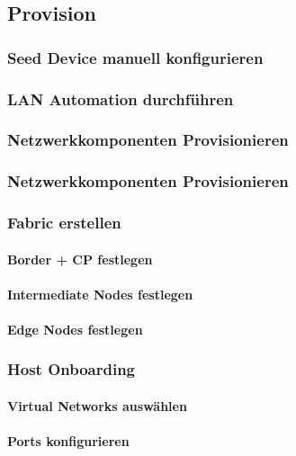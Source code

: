 \subsection{Provision}
\subsubsection{Seed Device manuell konfigurieren}

\subsubsection{LAN Automation durchführen}

\subsubsection{Netzwerkkomponenten Provisionieren}

\subsubsection{Netzwerkkomponenten Provisionieren}

\subsubsection{Fabric erstellen}
\paragraph{Border + CP festlegen}
\paragraph{Intermediate Nodes festlegen}
\paragraph{Edge Nodes festlegen}

\subsubsection{Host Onboarding}

\paragraph{Virtual Networks auswählen}

\paragraph{Ports konfigurieren}


